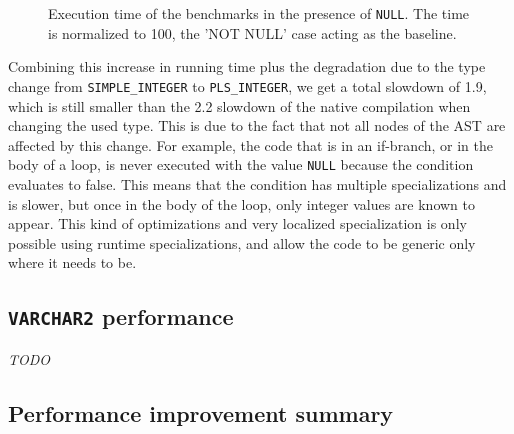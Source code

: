 \documentclass[twoside,11pt,a4paper]{article}
\newcommand{\pls}[1]{\texttt{#1}}
\newcommand{\plstype}[1]{\pls{#1}}
\newcommand{\varchar}{\plstype{VARCHAR2}}
\newcommand{\plsi}{\plstype{PLS\_INTEGER}}
\newcommand{\simpleint}{\plstype{SIMPLE\_INTEGER}}
\newcommand{\plsnull}{\pls{NULL}}
\begin{document}
\begin{figure}[tp]
	\centering
	\caption{Execution time of the benchmarks in the presence of \plsnull{}. The time is normalized to 100, the 'NOT NULL' case acting as the baseline.}
	\label{fig:exp2b}
\end{figure}

Combining this increase in running time plus the degradation due to the type change from \simpleint{} to \plsi{}, we get a total slowdown of 1.9, which is still smaller than the 2.2 slowdown of the native compilation when changing the used type. This is due to the fact that not all nodes of the AST are affected by this change. For example, the code that is in an if-branch, or in the body of a loop, is never executed with the value \plsnull{} because the condition evaluates to false. This means that the condition has multiple specializations and is slower, but once in the body of the loop, only integer values are known to appear. This kind of optimizations and very localized specialization is only possible using runtime specializations, and allow the code to be generic only where it needs to be.


\subsection{\varchar{} performance}

\textit{TODO}

\subsection{Performance improvement summary}
\end{document}

